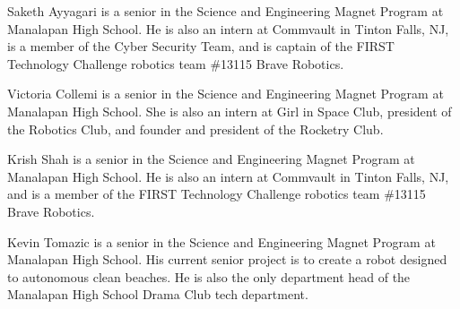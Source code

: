 \documentclass[10pt,journal,twoside]{IEEEtran}
\begin{document}



\begin{IEEEbiography}{Saketh Ayyagari} is a senior in the Science and Engineering Magnet Program at Manalapan High School. He is also an intern at Commvault in Tinton Falls, NJ, is a member of the Cyber Security Team, and is captain of the FIRST Technology Challenge robotics team \#13115 Brave Robotics. 
\end{IEEEbiography}

\begin{IEEEbiography}{Victoria Collemi} is a senior in the Science and Engineering Magnet Program at Manalapan High School. She is also an intern at Girl in Space Club, president of the Robotics Club, and founder and president of the Rocketry Club. 
\end{IEEEbiography}
\vfill
\newpage 
\begin{IEEEbiography}{Krish Shah} is a senior in the Science and Engineering Magnet Program at Manalapan High School. He is also an intern at Commvault in Tinton Falls, NJ, and is a member of the FIRST Technology Challenge robotics team \#13115 Brave Robotics. 
\end{IEEEbiography}

\begin{IEEEbiography}{Kevin Tomazic} is a senior in the Science and Engineering Magnet Program at Manalapan High School. His current senior project is to create a robot designed to autonomous clean beaches. He is also the only department head of the Manalapan High School Drama Club tech department. 
\end{IEEEbiography}
\vfill
\end{document}
